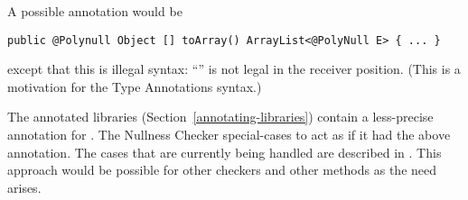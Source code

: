 A possible annotation would be

\begin{Verbatim}
public @Polynull Object [] toArray() ArrayList<@PolyNull E> { ... }
\end{Verbatim}

\noindent
except that this is illegal syntax:  ``'' is
not legal in the receiver position.  (This is a motivation for
the Type Annotations syntax.)

The annotated libraries (Section~\ref{annotating-libraries}) contain a less-precise annotation for
.  The Nullness Checker special-cases  to
act as if it had the above annotation.  The cases that
are currently being handled are described in
.
This approach would be possible for other checkers and other methods as the
need arises.


